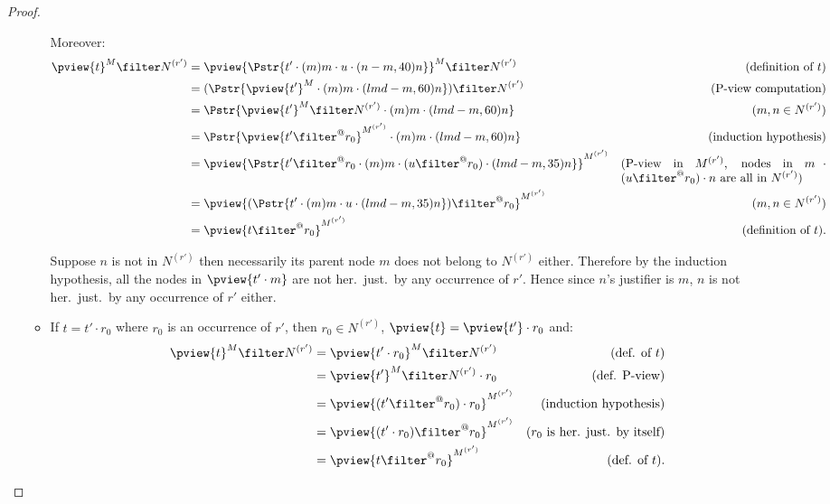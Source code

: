 \begin{proof}
\begin{itemize}
\begin{itemize}
    Moreover:
            \begin{align*}
            \pview{t}^M \filter  N^{(r')}            &= \pview{\Pstr{t' \cdot (m){m} \cdot u \cdot (n-m,40){n}}}^M \filter  N^{(r')}
                                                                  & (\mbox{definition of } t)\\
            &= (\Pstr{\pview{t'}^M \cdot (m){m} \cdot  (lmd-m,60){n}}) \filter  N^{(r')}                                                                  & (\mbox{P-view computation}) \\
            &= \Pstr{ \pview{t'}^M \filter N^{(r')} \cdot (m){m} \cdot  (lmd-m,60){n} }
                                                                  & (\mbox{$m, n \in N^{(r')}$}) \\
            &= \Pstr{ \pview{t'\filter^@ r_0}^{M^{(r')}}  \cdot (m){m} \cdot  (lmd-m,60){n} }
                                                                  & \mbox{(induction hypothesis)} \\
            &= \pview{ \Pstr{t' \filter^@ r_0 \cdot (m){m} \cdot {(u \filter^@ r_0)} \cdot (lmd-m,35){n}}}^{M^{(r')}}
                                                               & \parbox[t]{6cm}{(P-view in $M^{(r')}$, nodes in $m\cdot (u \filter^@ r_0) \cdot n$ are all in $N^{(r')}$)} \\
            &= \pview{ (\Pstr{t' \cdot (m){m} \cdot u \cdot (lmd-m,35){n}}) \filter^@ r_0 }^{M^{(r')}}
                                                               & (m, n \in N^{(r')}) \\
            &= \pview{ t \filter^@ r_0 }^{M^{(r')}}                & \mbox{(definition of $t$).}
            \end{align*}

    Suppose $n$ is not in $N^{(r')}$ then necessarily its parent node $m$ does not belong to $N^{(r')}$ either.
    Therefore by the induction hypothesis, all the nodes in $\pview{t' \cdot m}$ are not her.\ just.\ by any occurrence
    of $r'$. Hence since $n$'s justifier is $m$, $n$ is not her.\ just.\ by any occurrence
    of $r'$ either.

    \item If $t =  t' \cdot r_0$ where $r_0$ is an occurrence of $r'$, then $r_0 \in N^{(r')}$, $\pview{t} = \pview{t'} \cdot r_0$ and:
        \begin{align*}
        \pview{t}^M \filter N^{(r')}
            &=  \pview{t' \cdot r_0 }^M \filter N^{(r')}  & (\mbox{def. of } t)\\
            &=  \pview{t'}^M \filter N^{(r')} \cdot r_0 & (\mbox{def. P-view})\\
            &=  \pview{(t'\filter^@ r_0) \cdot r_0 }^{M^{(r')}}    & (\mbox{induction hypothesis})\\
            &=  \pview{(t' \cdot r_0)  \filter^@ r_0 }^{M^{(r')}}    & (\mbox{$r_0$ is her. just. by itself})\\
            &= \pview{t \filter^@  r_0 }^{M^{(r')}}                & (\mbox{def. of } t).
        \end{align*}


\end{itemize}
\end{itemize}
\end{proof}

